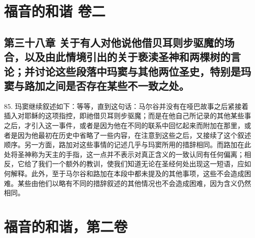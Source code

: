 
\section{福音的和谐 卷二}


\subsection{第三十八章  关于有人对他说他借贝耳则步驱魔的场合，以及由此情境引出的关于亵渎圣神和两棵树的言论；并讨论这些段落中玛窦与其他两位圣史，特别是玛窦与路加之间是否存在某些不一致之处。}

85. 玛窦继续叙述如下：等等，直到这句话：马尔谷并没有在哑巴故事之后紧接着插入对耶稣的这项指控，即祂借贝耳则步驱魔；而是在他自己所记录的其他某些事之后，才引入这一事件，或者是因为他在不同的联系中回忆起来而附加在那里，或者是因为他最初在历史中省略了一些内容，在注意到这些之后，又接续了这个叙述顺序。另一方面，路加对这些事情的记述几乎与玛窦所用的措辞相同。而路加在此处将圣神称为天主的手指，这一点并不表示对真正含义的一致认同有任何偏离；相反，它给了我们一个额外的教训，使我们知道无论在圣经何处出现这一短语，应如何解释。此外，至于马尔谷和路加在本段中都未提及的其他事项，这些不会造成困难。某些由他们以略有不同的措辞叙述的其他情况也不会造成困难，因为含义仍然相同。\par



\section{福音的和谐，第二卷}


